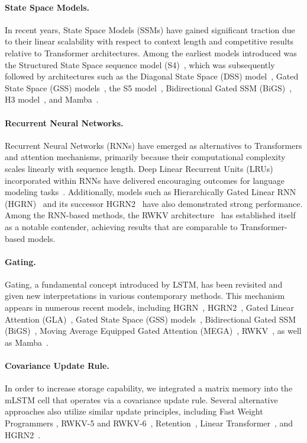 \paragraph{State Space Models.} In recent years, State Space Models (SSMs) have gained significant traction due to their linear scalability with respect to context length and competitive results relative to Transformer architectures. Among the earliest models introduced was the Structured State Space sequence model (S4)~\citep{Gu:21}, which was subsequently followed by architectures such as the Diagonal State Space (DSS) model~\citep{Gupta:22}, Gated State Space (GSS) models~\citep{Mehta:22}, the S5 model~\citep{Smith:22}, Bidirectional Gated SSM (BiGS)~\citep{Wang:22}, H3 model~\citep{Fu:23}, and Mamba~\citep{Gu:24arxiv}.

\paragraph{Recurrent Neural Networks.} Recurrent Neural Networks (RNNs) have emerged as alternatives to Transformers and attention mechanisms, primarily because their computational complexity scales linearly with sequence length. Deep Linear Recurrent Units (LRUs) incorporated within RNNs have delivered encouraging outcomes for language modeling tasks~\citep{Orvieto:23, De:24arxiv}. Additionally, models such as Hierarchically Gated Linear RNN (HGRN)~\citep{Qin:23} and its successor HGRN2~\citep{Qin:24arxiv} have also demonstrated strong performance. Among the RNN-based methods, the RWKV architecture~\citep{Peng:23arxivshort,Peng:24arxivshort} has established itself as a notable contender, achieving results that are comparable to Transformer-based models.

\paragraph{Gating.}
Gating, a fundamental concept introduced by LSTM, has been revisited and given new interpretations in various contemporary methods. This mechanism appears in numerous recent models, including HGRN~\citep{Qin:23}, HGRN2~\citep{Qin:24arxiv}, Gated Linear Attention (GLA)~\citep{Yang:23arxiv}, Gated State Space (GSS) models~\citep{Mehta:22}, Bidirectional Gated SSM (BiGS)~\citep{Wang:22}, Moving Average Equipped Gated Attention (MEGA)~\citep{Ma:22}, RWKV~\citep{Peng:23arxivshort}, as well as Mamba~\citep{Gu:24arxiv}.

\paragraph{Covariance Update Rule.} In order to increase storage capability, we integrated a matrix memory into the mLSTM cell that operates via a covariance update rule. Several alternative approaches also utilize similar update principles, including Fast Weight Programmers \citep{Schmidhuber:92ncfastweights,Schlag:21}, RWKV-5 and RWKV-6~\citep{Peng:24arxivshort}, Retention~\citep{Sun:23arxiv}, Linear Transformer~\citep{Katharopoulos:20}, and HGRN2~\citep{Qin:24arxiv}.

